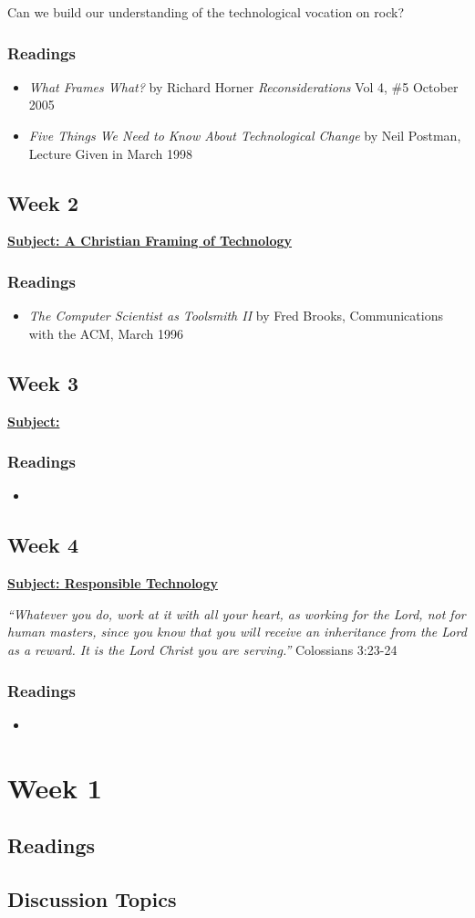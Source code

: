 \documentclass[11pt]{article}
\let\oldsection\section
\renewcommand\section{\clearpage\oldsection}
\begin{document}
Can we build our understanding of the technological vocation on rock?
\subsubsection*{Readings}
\label{sec:orgc531c8c}
\begin{itemize}
\item \emph{What Frames What?} by Richard Horner \emph{Reconsiderations} Vol 4, \#5 October
2005
\item \emph{Five Things We Need to Know About Technological Change} by Neil Postman,
Lecture Given in March 1998
\end{itemize}
\subsection*{Week 2}
\label{sec:org5dbd6c3}
\textbf{\uline{Subject: A Christian Framing of Technology}}
\subsubsection*{Readings}
\label{sec:orga4b77bb}
\begin{itemize}
\item \emph{The Computer Scientist as Toolsmith II} by Fred Brooks, Communications with
the ACM, March 1996
\end{itemize}
\subsection*{Week 3}
\label{sec:org7a888c8}
\textbf{\uline{Subject:}}
\subsubsection*{Readings}
\label{sec:org441be3a}
\begin{itemize}
\item 
\end{itemize}
\subsection*{Week 4}
\label{sec:org7352236}
\textbf{\uline{Subject: Responsible Technology}}

\emph{``Whatever you do, work at it with all your heart, as working for the Lord, not
for human masters, since you know that you will receive an inheritance from
the Lord as a reward. It is the Lord Christ you are serving.''} Colossians 3:23-24
\subsubsection*{Readings}
\label{sec:orgd248f5f}
\begin{itemize}
\item 
\end{itemize}
\section*{Week 1}
\label{sec:org38bcbe6}
\subsection*{Readings}
\label{sec:org0d2a0d5}
\subsection*{Discussion Topics}
\label{sec:org8c00371}
\end{document}

